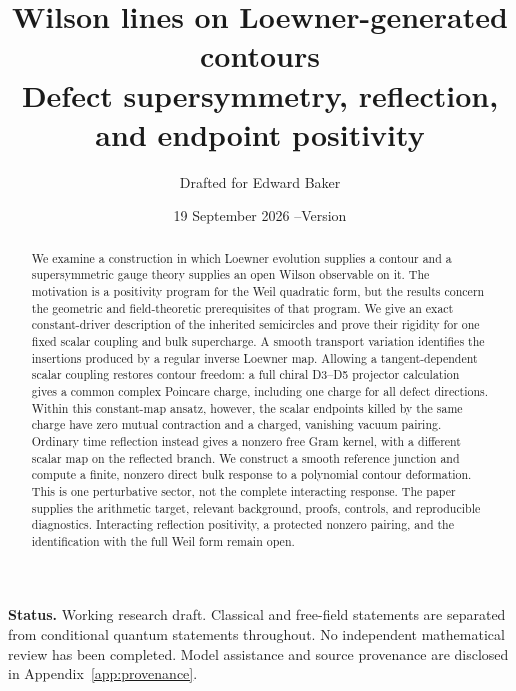 \documentclass[11pt]{article}
\title{Wilson lines on Loewner-generated contours\\[3pt]
\large Defect supersymmetry, reflection, and endpoint positivity}
\author{Drafted for Edward Baker}
\date{19 September 2026 \quad--\quad Version \draftversion}
\numberwithin{equation}{section}
\theoremstyle{definition}
\theoremstyle{remark}
\begin{document}
\maketitle
\begin{abstract}
We examine a construction in which Loewner evolution supplies a contour and
a supersymmetric gauge theory supplies an open Wilson observable on it.
The motivation is a positivity program for the Weil quadratic form, but
the results concern the geometric and field-theoretic prerequisites of
that program. We give an exact constant-driver description of the
inherited semicircles and prove their rigidity for one fixed scalar
coupling and bulk supercharge. A smooth transport variation identifies
the insertions produced by a regular inverse Loewner map. Allowing a
tangent-dependent scalar coupling restores contour freedom: a full
chiral D3--D5 projector calculation gives a common complex Poincare
charge, including one charge for all defect directions. Within this
constant-map ansatz, however, the scalar endpoints killed by the same
charge have zero mutual contraction and a charged, vanishing vacuum
pairing. Ordinary time reflection instead gives a nonzero free Gram
kernel, with a different scalar map on the reflected branch. We construct
a smooth reference junction and compute a finite, nonzero direct bulk
response to a polynomial contour deformation. This is one perturbative
sector, not the complete interacting response. The paper supplies the
arithmetic target, relevant background, proofs, controls, and reproducible
diagnostics. Interacting reflection positivity, a protected nonzero
pairing, and the identification with the full Weil form remain open.
\end{abstract}
\noindent\textbf{Status.} Working research draft. Classical and free-field
statements are separated from conditional quantum statements throughout.
No independent mathematical review has been completed. Model assistance
and source provenance are disclosed in Appendix~\ref{app:provenance}.
\tableofcontents










\appendix



\end{document}
